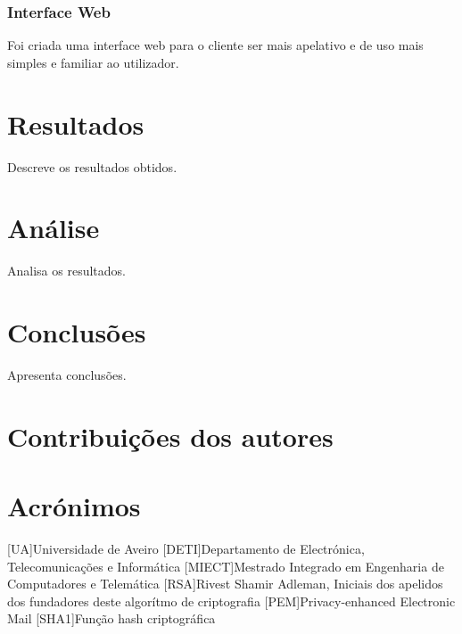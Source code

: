 \documentclass{report}
\begin{document}
\subsection{Interface Web}
Foi criada uma interface web para o cliente ser mais apelativo e de uso mais simples e familiar ao utilizador.

\chapter{Resultados}
\label{chap.resultados}
Descreve os resultados obtidos.

\chapter{Análise}
\label{chap.analise}
Analisa os resultados.

\chapter{Conclusões}
\label{chap.conclusao}
Apresenta conclusões.

\chapter*{Contribuições dos autores}

%

\chapter*{Acrónimos}
\begin{acronym}
 [UA]{Universidade de Aveiro}
 [DETI]{Departamento de Electrónica, Telecomunicações e Informática}
 [MIECT]{Mestrado Integrado em Engenharia de Computadores e Telemática}
 [RSA]{Rivest Shamir Adleman, Iniciais dos apelidos dos fundadores deste algorítmo de criptografia}
 [PEM]{Privacy-enhanced Electronic Mail}
 [SHA1]{Função hash criptográfica}
\end{acronym}


%
\end{document}
